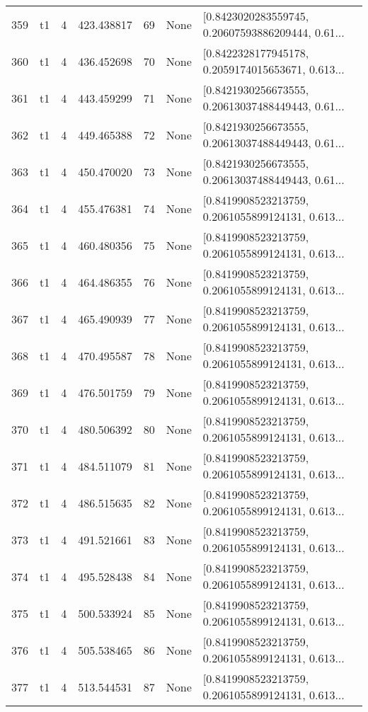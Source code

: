 \begin{tabular}{lllrlll}
359 &  t1 &   4 &  423.438817 &   69 &  None &  [0.8423020283559745, 0.20607593886209444, 0.61... \\
360 &  t1 &   4 &  436.452698 &   70 &  None &  [0.8422328177945178, 0.2059174015653671, 0.613... \\
361 &  t1 &   4 &  443.459299 &   71 &  None &  [0.8421930256673555, 0.20613037488449443, 0.61... \\
362 &  t1 &   4 &  449.465388 &   72 &  None &  [0.8421930256673555, 0.20613037488449443, 0.61... \\
363 &  t1 &   4 &  450.470020 &   73 &  None &  [0.8421930256673555, 0.20613037488449443, 0.61... \\
364 &  t1 &   4 &  455.476381 &   74 &  None &  [0.8419908523213759, 0.2061055899124131, 0.613... \\
365 &  t1 &   4 &  460.480356 &   75 &  None &  [0.8419908523213759, 0.2061055899124131, 0.613... \\
366 &  t1 &   4 &  464.486355 &   76 &  None &  [0.8419908523213759, 0.2061055899124131, 0.613... \\
367 &  t1 &   4 &  465.490939 &   77 &  None &  [0.8419908523213759, 0.2061055899124131, 0.613... \\
368 &  t1 &   4 &  470.495587 &   78 &  None &  [0.8419908523213759, 0.2061055899124131, 0.613... \\
369 &  t1 &   4 &  476.501759 &   79 &  None &  [0.8419908523213759, 0.2061055899124131, 0.613... \\
370 &  t1 &   4 &  480.506392 &   80 &  None &  [0.8419908523213759, 0.2061055899124131, 0.613... \\
371 &  t1 &   4 &  484.511079 &   81 &  None &  [0.8419908523213759, 0.2061055899124131, 0.613... \\
372 &  t1 &   4 &  486.515635 &   82 &  None &  [0.8419908523213759, 0.2061055899124131, 0.613... \\
373 &  t1 &   4 &  491.521661 &   83 &  None &  [0.8419908523213759, 0.2061055899124131, 0.613... \\
374 &  t1 &   4 &  495.528438 &   84 &  None &  [0.8419908523213759, 0.2061055899124131, 0.613... \\
375 &  t1 &   4 &  500.533924 &   85 &  None &  [0.8419908523213759, 0.2061055899124131, 0.613... \\
376 &  t1 &   4 &  505.538465 &   86 &  None &  [0.8419908523213759, 0.2061055899124131, 0.613... \\
377 &  t1 &   4 &  513.544531 &   87 &  None &  [0.8419908523213759, 0.2061055899124131, 0.613... \\

\end{tabular}
